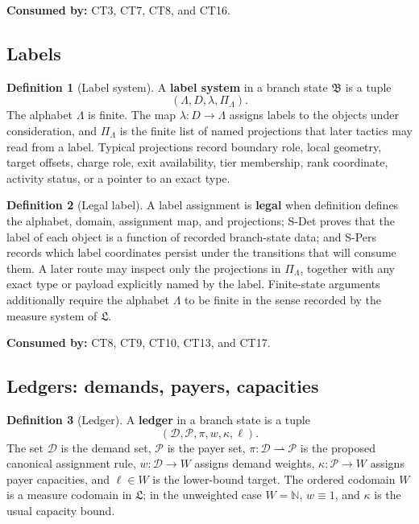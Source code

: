 \documentclass[
  11pt,
]{article}
\theoremstyle{definition}
\newtheorem{definition}{Definition}[section]
\begin{document}
\noindent\textbf{Consumed by:} CT3, CT7, CT8, and CT16.

\subsection{Labels}\label{data-labels}
\begin{definition}[Label system]\label{def:label-system}
A \textbf{label system} in a branch state \(\mathfrak B\) is a tuple
\[
(\Lambda,D,\lambda,\Pi_\Lambda).
\]
The alphabet \(\Lambda\) is finite.  The map
\(\lambda:D\to\Lambda\) assigns labels to the
objects under consideration, and \(\Pi_\Lambda\) is the finite list of
named projections that later tactics may read from a label.  Typical
projections record boundary role, local geometry, target offsets,
charge role, exit availability, tier membership, rank coordinate,
activity status, or a pointer to an exact type.
\end{definition}

\begin{definition}[Legal label]\label{def:legal-label}
A label assignment is \textbf{legal} when definition defines the alphabet,
domain, assignment map, and projections; S-Det proves that the label of
each object is a function of recorded branch-state data; and S-Pers
records which label coordinates persist under the transitions that will
consume them.  A later route may inspect only the projections in
\(\Pi_\Lambda\), together with any exact type or payload explicitly
named by the label.  Finite-state arguments additionally require the
alphabet \(\Lambda\) to be finite in the sense recorded by the measure
system of \(\mathfrak L\).
\end{definition}

\noindent\textbf{Consumed by:} CT8, CT9, CT10, CT13, and CT17.

\subsection{Ledgers: demands, payers, capacities}\label{data-ledgers}
\begin{definition}[Ledger]\label{def:ledger}
A \textbf{ledger} in a branch state is a tuple
\[
(\mathcal D,\mathcal P,\pi,w,\kappa,\ell).
\]
The set \(\mathcal D\) is the demand set, \(\mathcal P\) is the payer
set, \(\pi:\mathcal D\rightharpoonup\mathcal P\) is the proposed
canonical assignment rule,
\(w:\mathcal D\to W\) assigns demand weights, \(\kappa:\mathcal P\to W\)
assigns payer capacities, and \(\ell\in W\) is the lower-bound target.
The ordered codomain \(W\) is a measure codomain in \(\mathfrak L\);
in the unweighted case \(W=\mathbb N\), \(w\equiv1\), and \(\kappa\) is
the usual capacity bound.
\end{definition}
\end{document}
